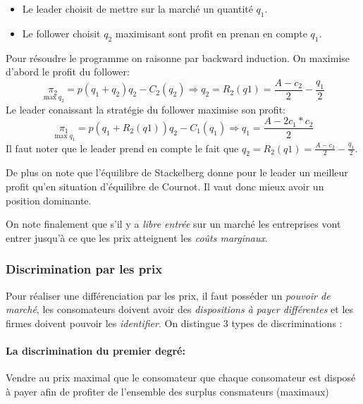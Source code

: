 \begin{tcolorbox}[title=Duopole de Stackelberg]
	
  \begin{itemize}[label=]
		\item Le leader choisit de mettre sur la marché un quantité $q_1$.
		\item Le follower choisit $q_2$ maximisant sont profit en prenan en compte $q_1$.
	\end{itemize}
	Pour résoudre le programme on raisonne par backward induction. On maximise d'abord le profit du follower:
	\[
		\underset{\max q_2}{\pi_2} = p(q_1+q_2)q_2-C_2(q_2) \Rightarrow q_2= R_2(q1)= \frac{A-c_2}{2}-\frac{q_1}{2}
	\]
	Le leader conaissant la stratégie du follower maximise son profit:
	\[
		\underset{\max q_1}{\pi_1} = p(q_1+R_2(q1))q_2-C_1(q_1) \Rightarrow q_1= \frac{A-2c_1*c_2}{2}
	\]
	Il faut noter que le leader prend en compte 
  le fait que $q_2= R_2(q1)= \frac{A-c_2}{2}-\frac{q_1}{2}$.
	
	De plus on note que l'équilibre de Stackelberg donne pour le 
  leader un meilleur profit qu'en situation d'équilibre de Cournot. 
  Il vaut donc mieux avoir un position dominante.
\end{tcolorbox}

On note finalement que s'il y a \emph{libre entrée} sur un marché 
les entreprises vont entrer jusqu'à ce que les prix atteignent les \emph{coûts marginaux}.

\subsubsection{Discrimination par les prix} %
\label{sub:discrimination_par_les_prix}
 Pour réaliser une différenciation par les prix, il faut posséder un \emph{pouvoir de marché},
 les consomateurs doivent avoir des \emph{dispositions à payer différentes} 
 et les firmes doivent pouvoir les \emph{identifier}. 
 On distingue 3 types de discriminations : 
 
 \paragraph{La discrimination du premier degré:} %
 \label{par:la_discrimination_du_premier_degre}
 Vendre au prix maximal que le consomateur que chaque consomateur est disposé 
 à payer afin de profiter de l'ensemble des surplus consmateurs (maximaux) 
 
 
